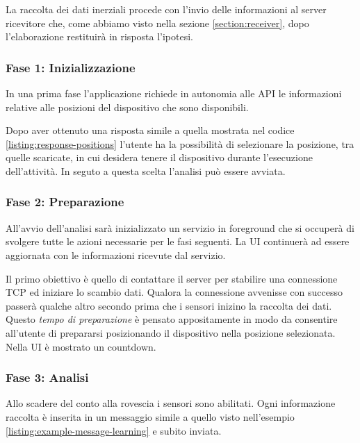 La raccolta dei dati inerziali procede con l'invio delle informazioni al server ricevitore che, 
come abbiamo visto nella sezione \ref{section:receiver}, dopo l'elaborazione restituirà in risposta l'ipotesi.


\subsubsection{Fase 1: Inizializzazione}
In una prima fase l'applicazione richiede in autonomia alle API le informazioni relative alle posizioni del dispositivo 
che sono disponibili.

Dopo aver ottenuto una risposta simile a quella mostrata nel codice \ref{listing:response-positions}  
l'utente ha la possibilità di selezionare la posizione, tra quelle scaricate, in cui desidera tenere 
il dispositivo durante l'esecuzione dell'attività. In seguto a questa scelta l'analisi può essere avviata.

\subsubsection{Fase 2: Preparazione}
All'avvio dell'analisi sarà inizializzato un servizio in foreground \cite{services} che si occuperà di svolgere tutte le azioni 
necessarie per le fasi seguenti. La UI continuerà ad essere aggiornata con le informazioni ricevute dal servizio.

Il primo obiettivo è quello di contattare il server per stabilire una connessione TCP ed iniziare lo scambio dati. 
Qualora la connessione avvenisse con successo passerà qualche altro secondo prima che i sensori inizino la raccolta dei dati.
Questo \textit{tempo di preparazione} è pensato appositamente in modo da consentire all'utente 
di prepararsi posizionando il dispositivo nella posizione selezionata. Nella UI è mostrato un countdown.

\subsubsection{Fase 3: Analisi}
Allo scadere del conto alla rovescia i sensori sono abilitati. 
Ogni informazione raccolta è inserita in un messaggio simile a quello visto 
nell'esempio \ref{listing:example-message-learning} e subito inviata.

